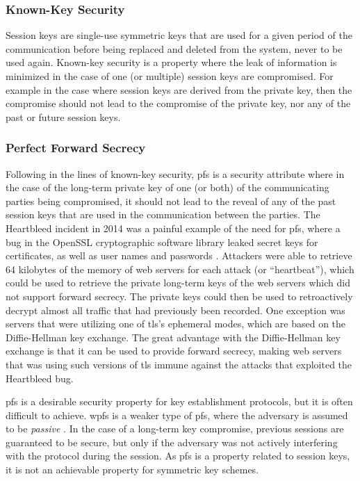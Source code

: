 \subsubsection{Known-Key Security}

Session keys are single-use symmetric keys that are used for a given period of the communication before being replaced and deleted from the system, never to be used again. Known-key security is a property where the leak of information is minimized in the case of one (or multiple) session keys are compromised. For example in the case where session keys are derived from the private key, then the compromise should not lead to the compromise of the private key, nor any of the past or future session keys. 

\subsubsection{Perfect Forward Secrecy}

Following in the lines of known-key security, \gls{pfs} is a security attribute where in the case of the long-term private key of one (or both) of the communicating parties being compromised, it should not lead to the reveal of any of the past session keys that are used in the communication between the parties. The Heartbleed incident in 2014 was a painful example of the need for \gls{pfs}, where a bug in the OpenSSL cryptographic software library leaked secret keys for certificates, as well as user names and passwords \cite{durumeric2014matter}. Attackers were able to retrieve 64 kilobytes of the memory of web servers for each attack (or ``heartbeat''), which could be used to retrieve the private long-term keys of the web servers which did not support forward secrecy. The private keys could then be used to retroactively decrypt almost all traffic that had previously been recorded. One exception was servers that were utilizing one of \gls{tls}'s ephemeral modes, which are based on the Diffie-Hellman key exchange. The great advantage with the Diffie-Hellman key exchange is that it can be used to provide forward secrecy, making web servers that was using such versions of \gls{tls} immune against the attacks that exploited the Heartbleed bug.



\gls{pfs} is a desirable security property for key establishment protocols, but it is often difficult to achieve. \gls{wpfs} is a weaker type of \gls{pfs}, where the adversary is assumed to be \emph{passive} \cite{krawczyk2005hmqv}. In the case of a long-term key compromise, previous sessions are guaranteed to be secure, but only if the adversary was not actively interfering with the protocol during the session.  As \gls{pfs} is a property related to session keys, it is not an achievable property for symmetric key schemes.

